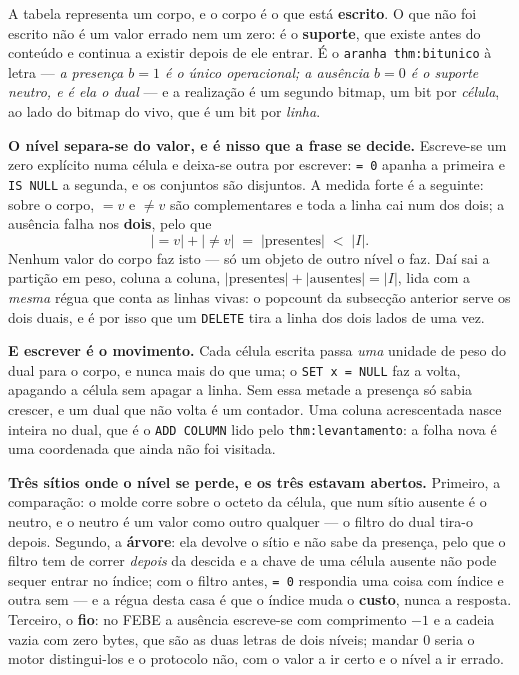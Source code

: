 \documentclass[11pt,a4paper]{article}
\newcommand{\code}[1]{\texttt{\small #1}}
\begin{document}
\noindent A tabela representa um corpo, e o corpo é o que está \textbf{escrito}.
O que não foi escrito não é um valor errado nem um zero: é o \textbf{suporte},
que existe antes do conteúdo e continua a existir depois de ele entrar. É o
\code{aranha thm:bitunico} à letra --- \emph{a presença $b=1$ é o único
operacional; a ausência $b=0$ é o suporte neutro, e é ela o dual} --- e a
realização é um segundo bitmap, um bit por \emph{célula}, ao lado do bitmap do
vivo, que é um bit por \emph{linha}.

\medskip\noindent\textbf{O nível separa-se do valor, e é nisso que a frase se
decide.} Escreve-se um zero explícito numa célula e deixa-se outra por escrever:
\code{= 0} apanha a primeira e \code{IS NULL} a segunda, e os conjuntos são
disjuntos. A medida forte é a seguinte: sobre o corpo, $=v$ e $\neq v$ são
complementares e toda a linha cai num dos dois; a ausência falha nos
\textbf{dois}, pelo que
\[
\lvert{=}v\rvert+\lvert{\neq}v\rvert \;=\; \lvert\text{presentes}\rvert
\;<\; \lvert I\rvert .
\]
Nenhum valor do corpo faz isto --- só um objeto de outro nível o faz. Daí sai a
partição em peso, coluna a coluna,
$\lvert\text{presentes}\rvert+\lvert\text{ausentes}\rvert=\lvert I\rvert$, lida
com a \emph{mesma} régua que conta as linhas vivas: o popcount da subsecção
anterior serve os dois duais, e é por isso que um \code{DELETE} tira a linha dos
dois lados de uma vez.

\medskip\noindent\textbf{E escrever é o movimento.} Cada célula escrita passa
\emph{uma} unidade de peso do dual para o corpo, e nunca mais do que uma; o
\code{SET x = NULL} faz a volta, apagando a célula sem apagar a linha. Sem essa
metade a presença só sabia crescer, e um dual que não volta é um contador. Uma
coluna acrescentada nasce inteira no dual, que é o \code{ADD COLUMN} lido pelo
\code{thm:levantamento}: a folha nova é uma coordenada que ainda não foi
visitada.

\medskip\noindent\textbf{Três sítios onde o nível se perde, e os três estavam
abertos.} Primeiro, a comparação: o molde corre sobre o octeto da célula, que
num sítio ausente é o neutro, e o neutro é um valor como outro qualquer --- o
filtro do dual tira-o depois. Segundo, a \textbf{árvore}: ela devolve o sítio e
não sabe da presença, pelo que o filtro tem de correr \emph{depois} da descida e
a chave de uma célula ausente não pode sequer entrar no índice; com o filtro
antes, \code{= 0} respondia uma coisa com índice e outra sem --- e a régua desta
casa é que o índice muda o \textbf{custo}, nunca a resposta. Terceiro, o
\textbf{fio}: no FEBE a ausência escreve-se com comprimento $-1$ e a cadeia
vazia com zero bytes, que são as duas letras de dois níveis; mandar $0$ seria o
motor distingui-los e o protocolo não, com o valor a ir certo e o nível a ir
errado.
\end{document}
